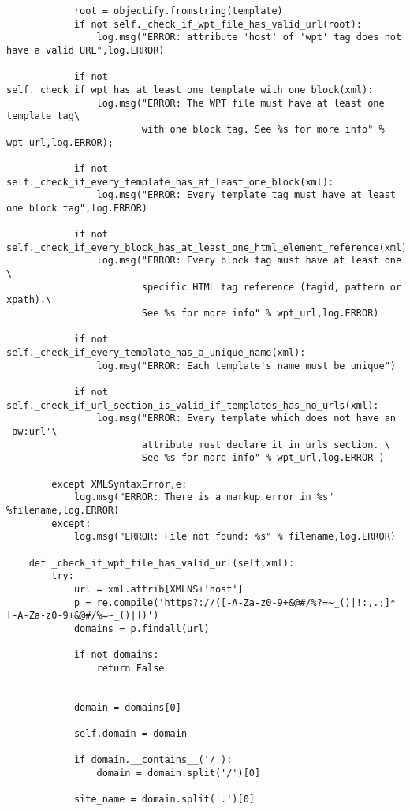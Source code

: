 \begin{lstlisting}
            root = objectify.fromstring(template)
            if not self._check_if_wpt_file_has_valid_url(root):
                log.msg("ERROR: attribute 'host' of 'wpt' tag does not have a valid URL",log.ERROR)

            if not self._check_if_wpt_has_at_least_one_template_with_one_block(xml):
                log.msg("ERROR: The WPT file must have at least one template tag\
                        with one block tag. See %s for more info" % wpt_url,log.ERROR);
    
            if not self._check_if_every_template_has_at_least_one_block(xml):
                log.msg("ERROR: Every template tag must have at least one block tag",log.ERROR)
    
            if not self._check_if_every_block_has_at_least_one_html_element_reference(xml):
                log.msg("ERROR: Every block tag must have at least one \
                        specific HTML tag reference (tagid, pattern or xpath).\
                        See %s for more info" % wpt_url,log.ERROR)

            if not self._check_if_every_template_has_a_unique_name(xml):
                log.msg("ERROR: Each template's name must be unique")
            
            if not self._check_if_url_section_is_valid_if_templates_has_no_urls(xml):
                log.msg("ERROR: Every template which does not have an 'ow:url'\
                        attribute must declare it in urls section. \
                        See %s for more info" % wpt_url,log.ERROR )

        except XMLSyntaxError,e:
            log.msg("ERROR: There is a markup error in %s" %filename,log.ERROR)
        except:
            log.msg("ERROR: File not found: %s" % filename,log.ERROR)
       
    def _check_if_wpt_file_has_valid_url(self,xml):
        try:
            url = xml.attrib[XMLNS+'host']
            p = re.compile('https?://([-A-Za-z0-9+&@#/%?=~_()|!:,.;]*[-A-Za-z0-9+&@#/%=~_()|])')
            domains = p.findall(url)
            
            if not domains: 
                return False
    
     
            domain = domains[0]

            self.domain = domain 

            if domain.__contains__('/'):
                domain = domain.split('/')[0]
     
            site_name = domain.split('.')[0]
     

\end{lstlisting}

